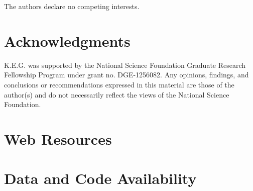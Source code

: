\documentclass[12pt]{article}
\begin{document}
The authors declare no competing interests.

\section*{Acknowledgments}


K.E.G. was supported by the National Science Foundation Graduate Research Fellowship Program under grant no. DGE-1256082. Any opinions, findings, and conclusions or recommendations expressed in this material are those of the author(s) and do not necessarily reflect the views of the National Science Foundation.

\section*{Web Resources}


\section*{Data and Code Availability}

\end{document}
